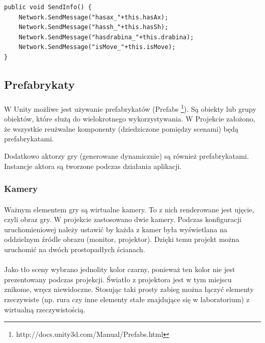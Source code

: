 \begin{lstlisting}[language=CSharp]
public void SendInfo() {
	Network.SendMessage("hasax_"+this.hasAx);
	Network.SendMessage("hassh_"+this.hasSh);
	Network.SendMessage("hasdrabina_"+this.drabina);
	Network.SendMessage("isMove_"+this.isMove);
}
\end{lstlisting}

\subsection{Prefabrykaty}
\paragraph{}
W Unity możliwe jest używanie prefabrykatów (Prefabs \footnote{http://docs.unity3d.com/Manual/Prefabs.html}). Są obiekty lub grupy obiektów, które służą do wielokrotnego wykorzystywania. W Projekcie założono, że wszystkie reużwalne komponenty (dziedziczone pomiędzy scenami) będą prefabrykatami.

Dodatkowo aktorzy gry (generowane dynamicznie) są również prefabrykatami. Instancje aktora są tworzone podczas działania aplikacji.

\subsubsection{Kamery}
\paragraph{}
Ważnym elementem gry są wirtualne kamery. To z nich renderowane jest ujęcie, czyli obraz gry. W projekcie zastosowano dwie kamery. Podczas konfiguracji uruchomieniowej należy ustawić by każda z kamer była wyświetlana na oddzielnym źródle obrazu (monitor, projektor). Dzięki temu projekt można uruchomić na dwóch prostopadłych ścianach.
\paragraph{}
Jako tło sceny wybrano jednolity kolor czarny, ponieważ ten kolor nie jest prezentowany podczas projekcji. Światło z projektora jest w tym miejscu znikome, wręcz niewidoczne. Stosując taki prosty zabieg można łączyć elementy rzeczywiste (np. rura czy inne elementy stałe znajdujące się w laboratorium) z wirtualną rzeczywistością.

